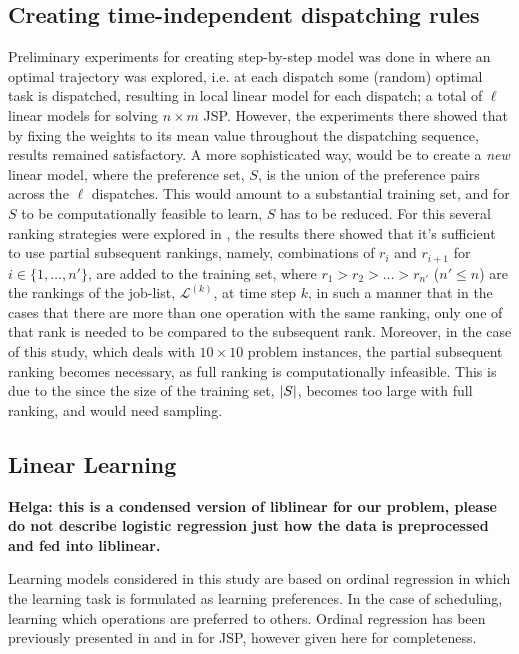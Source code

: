 \documentclass[smallextended]{svjour3}
\begin{document}
	\subsection{Creating time-independent dispatching rules}\label{sec:ord:timeindependent}
	
	Preliminary experiments for creating step-by-step model was done in \cite{InRu11a} where an optimal trajectory was explored, i.e. at each dispatch some (random) optimal task is dispatched, resulting in local linear model for each dispatch; a total of $\ell$ linear models for solving $n\times m$ JSP. However, the experiments there showed that by fixing the weights to its mean value throughout the dispatching sequence, results remained satisfactory.  
	A more sophisticated way, would be to create a \emph{new} linear model, where the preference set, $S$, is the union of the preference pairs across the $\ell$ dispatches. This would amount to a substantial training set, and for $S$ to be computationally feasible to learn, $S$ has to be reduced. For this several ranking strategies were explored in \cite{InRu14b}, the results there showed that it's sufficient to use partial subsequent rankings, namely, combinations of $r_i$ and $r_{i+1}$ for $i\in\{1,\ldots,n'\}$, are added to the training set, where $r_1>r_2>\ldots>r_{n'}$ ($n'\leq n$) are the rankings of the job-list, $\mathcal{L}^{(k)}$, at time step $k$, in such a manner that in the cases that there are more than one operation with the same ranking, only one of that rank is needed to be compared to the subsequent rank. Moreover, in the case of this study, which deals with $10\times 10$ problem instances, the partial subsequent ranking becomes necessary, as full ranking is computationally infeasible. This is due to the since the size of the training set, $\lvert S\rvert$, becomes too large with full ranking, and would need sampling.
	
	
	\subsection{Linear Learning}
	
	{\bf Helga: this is a condensed version of liblinear for our problem, please do not describe logistic regression just how the data is preprocessed and fed into liblinear.}
	
	Learning models considered in this study are based on ordinal regression in which the learning task is formulated as learning preferences. In the case of scheduling, learning which operations are preferred to others. Ordinal regression has been previously presented in \cite{Ru06:PPSN} and in \cite{InRu11a} for JSP, however given here for completeness. 
	
\end{document}
